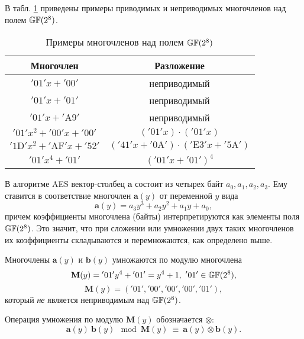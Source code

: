 \example
В табл. \ref{tab:irreducible-gf8} приведены примеры приводимых и неприводимых многочленов над полем $\mathbb{GF}(2^8)$.
\begin{table}[!ht]
    \centering
    \caption{Примеры многочленов над полем $\mathbb{GF}(2^8)$\label{tab:irreducible-gf8}}
    \begin{tabular}{|c|c|}
        \hline
        Многочлен & Разложение \\
        \hline
        $\mathrm{'01'} x + \mathrm{'00'}$ & неприводимый \\
        $\mathrm{'01'} x + \mathrm{'01'}$ & неприводимый \\
        $\mathrm{'01'} x + \mathrm{'A9'}$ & неприводимый \\
        $\mathrm{'01'} x^2 + \mathrm{'00'} x + \mathrm{'00'}$ & $(\mathrm{'01'} x) \cdot (\mathrm{'01'} x)$ \\
        $\mathrm{'1D'} x^2 + \mathrm{'AF'} x + \mathrm{'52'}$ & $(\mathrm{'41'} x + \mathrm{'0A'}) \cdot (\mathrm{'E3'} x + \mathrm{'5A'})$ \\
        $\mathrm{'01'} x^4 + \mathrm{'01'}$ & $(\mathrm{'01'} x + \mathrm{'01'})^4$ \\
        \hline
    \end{tabular}
\end{table}
\exampleend

В алгоритме AES вектор-столбец $\mathbf{a}$ состоит из четырех байт $a_{0}, a_{1}, a_{2}, a_{3}$. Ему ставится в соответствие многочлен $\mathbf{a}(y)$ от переменной $y$ вида
    \[ \mathbf{a}(y) = a_{3}y^{3}+a_{2}y^{2}+a_{1}y+a_{0}, \]
причем коэффициенты многочлена (байты) интерпретируются как элементы поля $\mathbb{GF}(2^{8})$. Это значит, что при сложении или умножении двух таких многочленов их коэффициенты складываются и перемножаются, как определено выше.

Многочлены $\mathbf{a}(y)$ и $\mathbf{b}(y)$ умножаются по модулю многочлена
    \[ \mathbf{M}(y)= \mathrm{'01'} y^4 + \mathrm{'01'} = y^4 + 1, ~ \mathrm{'01'} \in \mathbb{GF}(2^8), \]
    \[ \mathbf{M}(y)= (\mathrm{'01'}, \mathrm{'00'},\mathrm{'00'}, \mathrm{'00'}, \mathrm{'01'}), \]
который \emph{не} является неприводимым над $\mathbb{GF}(2^8)$.

Операция умножения по модулю $\mathbf{M}(y)$  обозначается $\otimes$:
    \[ \mathbf{a}(y) ~ \mathbf{b}(y) \mod \mathbf{M}(y) ~\equiv~ \mathbf{a}(y) \otimes \mathbf{b}(y). \]

